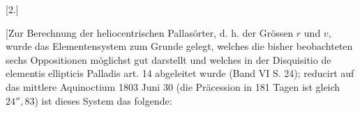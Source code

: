 \par{}\bigskip
{}
\begin{center}[2.]\end{center}
\begingroup
\newcommand{\IIILeaderPoint}{.\kern1.1pt}
\newcommand{\IIILeaderUpperLeft}{\rlap{\kern-.05em\raisebox{.5ex}{.}}\IIILeaderPoint}
\newcommand{\IIILeaderUpperRight}{\rlap{\kern.12em\raisebox{.5ex}{.}}\IIILeaderPoint}
\noindent\hspace*{\parindent}[Zur Berechnung der heliocentrischen Pallasörter, d. h. der Grössen \(r\) und \(v\), wurde das Elementensystem zum Grunde gelegt, welches die bisher beobachteten sechs Oppositionen möglichst gut darstellt und welches in der Disquisitio de elementis ellipticis Palladis art. 14 abgeleitet wurde (Band VI S. 24); reducirt auf das mittlere Aquinoctium 1803 Juni 30 (die Präcession in 181 Tagen ist gleich \(24'',\!83\)) ist dieses System das folgende:
